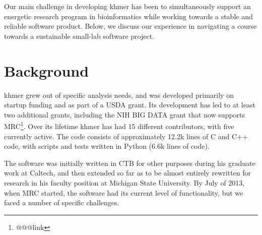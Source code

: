 \documentclass[11pt]{article}
\begin{document}
Our main challenge in developing khmer has been to simultaneously
support an energetic research program in bioinformatics while working
towards a stable and reliable software product.  Below, we discuss our
experience in navigating a course towards a sustainable small-lab
software project.

\section{Background}

khmer grew out of specific analysis needs, and was developed primarily
on startup funding and as part of a USDA grant.  Its development has
led to at least two additional grants, including the NIH BIG DATA
grant that now supports MRC\footnote{@@@link}.  Over its lifetime
khmer has had 15 different contributors, with five currently active.
The code consists of approximately 12.2k lines of C and C++ code, with
scripts and tests written in Python (6.6k lines of code).

The software was initially written in CTB for other purposes during
his graduate work at Caltech, and then extended so far as to be almost
entirely rewritten for research in his faculty position at Michigan
State University.  By July of 2013, when MRC started, the software had
its current level of functionality, but we faced a number of specific
challenges.
\end{document}
